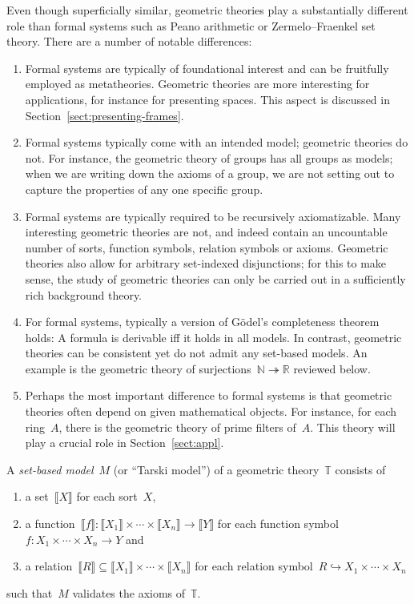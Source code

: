 \documentclass{ws-rv9x6}
\newcommand{\NN}{\mathbb{N}}
\newcommand{\RR}{\mathbb{R}}
\newcommand{\TT}{\mathbb{T}}
\renewcommand{\_}{\mathpunct{.}}
\newcommand{\?}{\,{:}\,}
\newcommand{\brak}[1]{{\llbracket{#1}\rrbracket}}
\begin{document}
Even though superficially similar, geometric theories play a
substantially different role than formal systems such as Peano arithmetic or
Zermelo--Fraenkel set theory. There are a number of notable differences:
\begin{enumerate}
\item Formal systems are typically of foundational interest and can be
fruitfully employed as metatheories. Geometric theories are more interesting
for applications, for instance for presenting spaces. This aspect is discussed
in Section~\ref{sect:presenting-frames}.
\item Formal systems typically come with an intended model; geometric theories
do not. For instance, the geometric theory of groups has all groups as models;
when we are writing down the axioms of a group, we are not setting out to
capture the properties of any one specific group.
\item Formal systems are typically required to be recursively
axiomatizable. Many interesting geometric theories are not, and indeed contain
an uncountable number of sorts, function symbols, relation symbols or axioms. Geometric theories also allow for arbitrary
set-indexed disjunctions; for this to make sense, the study of geometric
theories can only be carried out in a sufficiently rich background theory.
\item For formal systems, typically a version of Gödel's completeness theorem
holds: A formula is derivable iff it holds in all models. In contrast,
geometric theories can be consistent yet do not admit any set-based models. An
example is the geometric theory of surjections~$\NN \twoheadrightarrow \RR$
reviewed below.
\item Perhaps the most important difference to formal systems is that geometric
theories often depend on given mathematical objects. For instance, for each
ring~$A$, there is the geometric theory of prime filters of~$A$. This theory
will play a crucial role in Section~\ref{sect:appl}.
\end{enumerate}

\begin{definition}A \emph{set-based model}~$M$ (or ``Tarski model'') of a
geometric theory~$\TT$ consists of
\begin{enumerate}
  \item a set~$\brak{X}$ for each sort~$X$,
  \item a function~$\brak{f} : \brak{X_1} \times \cdots \times \brak{X_n} \to
  \brak{Y}$
  for each function symbol~$f : X_1 \times \cdots \times X_n \to Y$ and
  \item a relation~$\brak{R} \subseteq \brak{X_1} \times \cdots \times \brak{X_n}$
  for each relation symbol~$R \hookrightarrow X_1 \times \cdots \times X_n$
\end{enumerate}
such that~$M$ validates the axioms of~$\TT$.
\end{definition}
\end{document}
